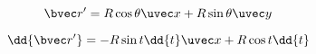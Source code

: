 
\begin{issues}
\issueDraft
\end{issues}

\begin{equation}
\bvec r' = R\cos\theta \uvec x + R\sin\theta \uvec y
\end{equation}


\begin{equation}
\dd{\bvec r'} = -R\sin t\dd{t} \uvec x + R\cos t \dd{t}
\end{equation}
